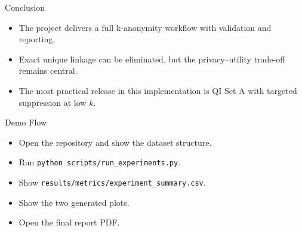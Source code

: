 \documentclass[aspectratio=169]{beamer}
\begin{document}
\begin{frame}{Conclusion}
    \begin{itemize}
        \item The project delivers a full k-anonymity workflow with validation and reporting.
        \item Exact unique linkage can be eliminated, but the privacy--utility trade-off remains central.
        \item The most practical release in this implementation is QI Set A with targeted suppression at low $k$.
    \end{itemize}
\end{frame}

\begin{frame}{Demo Flow}
    \begin{itemize}
        \item Open the repository and show the dataset structure.
        \item Run \texttt{python scripts/run\_experiments.py}.
        \item Show \texttt{results/metrics/experiment\_summary.csv}.
        \item Show the two generated plots.
        \item Open the final report PDF.
    \end{itemize}
\end{frame}
\end{document}
